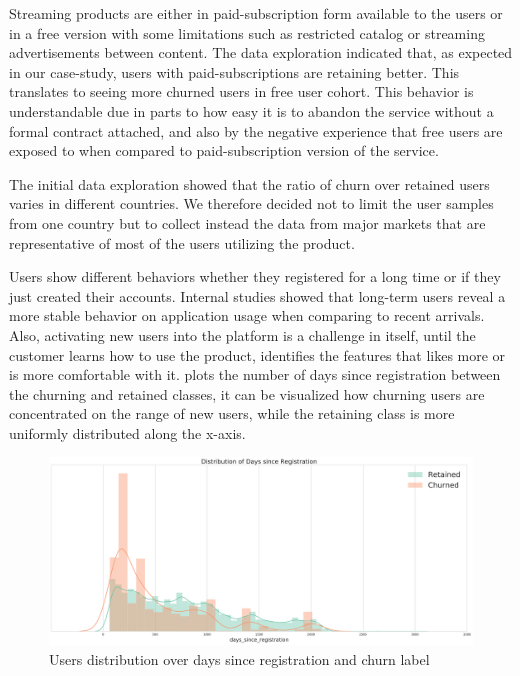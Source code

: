 \documentclass{kththesis}
\begin{document}
Streaming products are either in paid-subscription form available to the users or in a free version with some limitations such as restricted catalog or streaming advertisements between content. The data exploration indicated that, as expected in our case-study, users with paid-subscriptions are retaining better. This translates to seeing more churned users in free user cohort. This behavior is understandable due in parts to how easy it is to abandon the service without a formal contract attached, and also by the negative experience that free users are exposed to when compared to paid-subscription version of the service.

The initial data exploration showed that the ratio of churn over retained users varies in different countries. We therefore decided not to limit the user samples from one country but to collect instead the data from major markets that are representative of most of the users utilizing the product.

Users show different behaviors whether they registered for a long time or if they just created their accounts. Internal studies showed that long-term users reveal a more stable behavior on application usage when comparing to recent arrivals. Also, activating new users into the platform is a challenge in itself, until the customer learns how to use the product, identifies the features that likes more or is more comfortable with it.  plots the number of days since registration between the churning and retained classes, it can be visualized how churning users are concentrated on the range of new users, while the retaining class is more uniformly distributed along the x-axis.

	\begin{figure}[h]
    \centering
    \includegraphics[width=1.0\textwidth,keepaspectratio]{figures/days_since_reg.pdf}
    \caption{Users distribution over days since registration and churn label}
    \label{fig:dayssinceregdist}
	\end{figure}
\end{document}
